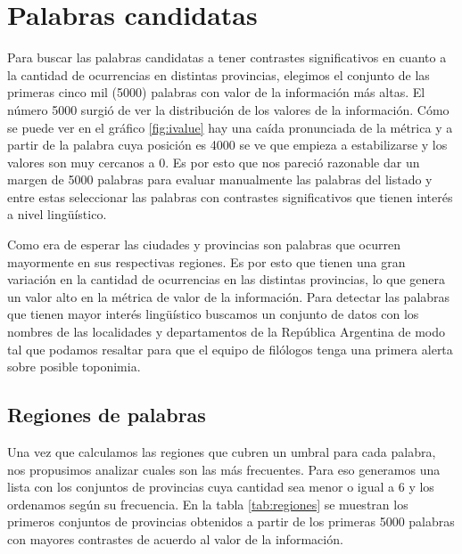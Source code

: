 \section{Palabras candidatas} %
\label{palabras_candidatas}
Para buscar las palabras candidatas a tener contrastes significativos en cuanto a la cantidad de ocurrencias en distintas provincias, elegimos el conjunto de las primeras 
cinco mil (5000) palabras con valor de la información más altas. El número 5000 surgió de ver la distribución de los valores de la información. Cómo se puede ver en 
el gráfico \ref{fig:ivalue} hay una caída pronunciada de la métrica y a partir de la palabra cuya posición es 4000 se ve que empieza a estabilizarse y los valores son 
muy cercanos a 0. Es por esto que nos pareció razonable dar un margen de 5000 palabras para evaluar manualmente las palabras del listado y entre estas seleccionar las palabras con contrastes significativos que tienen interés a nivel lingüístico.

Como era de esperar las ciudades y provincias son palabras que ocurren mayormente en sus respectivas regiones. Es por esto que tienen una gran variación en 
la cantidad de ocurrencias en las distintas provincias, lo que genera un valor alto en la métrica de valor de la información. Para detectar las palabras que tienen 
mayor interés lingüístico buscamos un conjunto de datos con los nombres de las localidades y departamentos de la República Argentina de modo tal que podamos resaltar para que el equipo de filólogos tenga una primera alerta sobre posible toponimia.



\subsection{Regiones de palabras} %
\label{sub:regiones_de_palabras}

Una vez que calculamos las regiones que cubren un umbral para cada palabra, nos propusimos analizar cuales son las más frecuentes. Para eso generamos una lista con los conjuntos de provincias cuya cantidad sea menor o igual a 6 y los ordenamos según su frecuencia. En la tabla \ref{tab:regiones} se muestran los primeros conjuntos de provincias obtenidos a partir de los primeras 5000 palabras con mayores contrastes de acuerdo al valor de la información.

